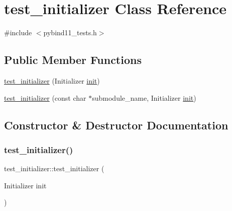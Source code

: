\hypertarget{classtest__initializer}{}\section{test\+\_\+initializer Class Reference}
\label{classtest__initializer}


{\ttfamily \#include $<$pybind11\+\_\+tests.\+h$>$}

\subsection*{Public Member Functions}
\begin{DoxyCompactItemize}
\item 
\mbox{\hyperlink{classtest__initializer_a23e9a4cab1099020d39658e9d3c0d116}{test\+\_\+initializer}} (Initializer \mbox{\hyperlink{pybind11_8h_a144961765ca31801e21d87651871934c}{init}})
\item 
\mbox{\hyperlink{classtest__initializer_ad6f55f585c6c07cd0b295c3dce55b9ed}{test\+\_\+initializer}} (const char $\ast$submodule\+\_\+name, Initializer \mbox{\hyperlink{pybind11_8h_a144961765ca31801e21d87651871934c}{init}})
\end{DoxyCompactItemize}


\subsection{Constructor \& Destructor Documentation}
\mbox{\label{classtest__initializer_a23e9a4cab1099020d39658e9d3c0d116}} 
\subsubsection{\texorpdfstring{test\_initializer()}{test\_initializer()}\hspace{0.1cm}{\footnotesize\ttfamily [1/2]}}
{\footnotesize\ttfamily test\+\_\+initializer\+::test\+\_\+initializer (\begin{DoxyParamCaption}\item[{Initializer}]{init }\end{DoxyParamCaption})}

\mbox{\label{classtest__initializer_ad6f55f585c6c07cd0b295c3dce55b9ed}} 
